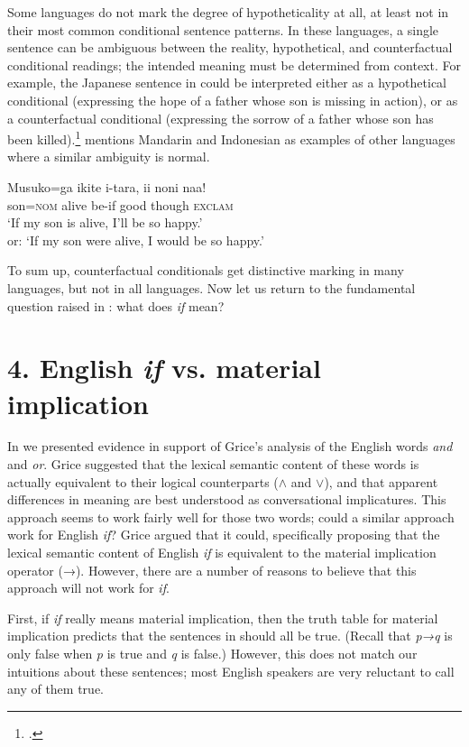 Some languages do not mark the degree of hypotheticality at all, at least not in their most common conditional sentence patterns. In these languages, a single sentence can be ambiguous between the reality, hypothetical, and counterfactual conditional readings; the intended meaning must be determined from context. For example, the Japanese sentence in  could be interpreted either as a hypothetical conditional (expressing the hope of a father whose son is missing in action), or as a counterfactual conditional (expressing the sorrow of a father whose son has been killed).\footnote{\citet[627]{Akatsuka1985}.} \citet{Comrie1986} mentions Mandarin and Indonesian as examples of other languages where a similar ambiguity is normal.


\ea
\gll Musuko=ga  ikite  i-tara,  ii  noni  naa!\\
son=\textsc{nom}  alive  be-if  good  though  \textsc{exclam}\\
\glt ‘If my son is alive, I’ll be so happy.’\\
or: ‘If my son were alive, I would be so happy.’
\z


To sum up, counterfactual conditionals get distinctive marking in many languages, but not in all languages. Now let us return to the fundamental question raised in : what does \textit{if} mean?


\section{4. English \textit{if} vs. material implication}\label{sec:}

In  we presented evidence in support of Grice’s analysis of the English words \textit{and} and \textit{or}. Grice suggested that the lexical semantic content of these words is actually equivalent to their logical counterparts ($\wedge$ and $\vee$), and that apparent differences in meaning are best understood as conversational implicatures. This approach seems to work fairly well for those two words; could a similar approach work for English \textit{if}? Grice argued that it could, specifically proposing that the lexical semantic content of English \textit{if} is equivalent to the material implication operator (→). However, there are a number of reasons to believe that this approach will not work for \textit{if}.



First, if \textit{if} really means material implication, then the truth table for material implication predicts that the sentences in  should all be true. (Recall that \textit{p→q} is only false when \textit{p} is true and \textit{q} is false.) However, this does not match our intuitions about these sentences; most English speakers are very reluctant to call any of them true.


